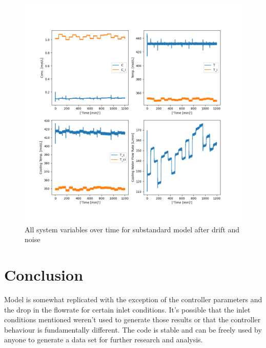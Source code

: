 \documentclass{article}
\begin{document}
\begin{figure}[H]
	\centering
	\includegraphics[width=1\textwidth]{img/dataset_substandard_all_sample}
	\caption{All system variables over time for substandard model after drift and noise}
	\label{fig:dataset_substandard_all_sample}
\end{figure}



\section{Conclusion}

Model is somewhat replicated with the exception of the controller parameters and the drop in the flowrate for certain inlet conditions. It's possible that the inlet conditions mentioned weren't used to generate those results or that the controller behaviour is fundamentally different. The code is stable and can be freely used by anyone to generate a data set for further research and analysis.



\end{document}
